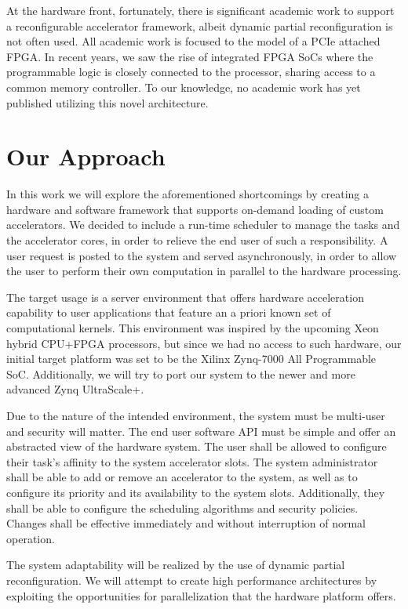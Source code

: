 At the hardware front, fortunately, there is significant academic work to support
a reconfigurable accelerator framework, albeit dynamic partial reconfiguration is not often used.
All academic work is focused to the model of a PCIe attached FPGA. 
In recent years, we saw the rise of integrated FPGA SoCs where the programmable logic is closely
connected to the processor, sharing access to a common memory controller. 
To our knowledge, no academic work has yet published utilizing this novel architecture.


\section{Our Approach}

In this work we will explore the aforementioned shortcomings by creating
a hardware and software framework that supports on-demand loading of custom accelerators.
We decided to include a run-time scheduler to manage the tasks and the accelerator cores,
in order to relieve the end user of such a responsibility. 
A user request is posted to the system and served asynchronously, 
in order to allow the user to perform their own computation in parallel to the hardware processing.

The target usage is a server environment that offers hardware acceleration capability
to user applications that feature an a priori known set of computational kernels.
This environment was inspired by the upcoming Xeon hybrid CPU+FPGA processors, but since we had no access
to such hardware, our initial target platform was set to be the Xilinx Zynq-7000 All Programmable SoC.
Additionally, we will try to port our system to the newer and more advanced Zynq UltraScale+.

Due to the nature of the intended environment, the system must be multi-user and security will matter.
The end user software API must be simple and offer an abstracted view of the hardware system.
The user shall be allowed to configure their task's affinity to the system
accelerator slots. The system administrator shall be able to add or remove an accelerator
to the system, as well as to configure its priority and its availability to the system slots. 
Additionally, they shall be able to configure the scheduling algorithms and security policies.
Changes shall be effective immediately and without interruption of normal operation.

The system adaptability will be realized by the use of dynamic partial reconfiguration.
We will attempt to create high performance architectures by exploiting 
the opportunities for parallelization that the hardware platform offers.

